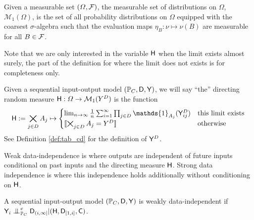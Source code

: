 \begin{definition}
Given a measurable set $(\Omega,\mathcal{F})$, the measurable set of distributions on $\Omega$, $\mathcal{M}_1(\Omega)$, is the set of all probability distributions on $\Omega$ equipped with the coarsest $\sigma$-algebra such that the evaluation maps $\eta_B:\nu\mapsto \nu(B)$ are measurable for all $B\in \mathcal{F}$.
\end{definition}

Note that we are only interested in the variable $\mathsf{H}$ when the limit exists almost surely, the part of the definition for where the limit does not exists is for completeness only.

\begin{definition}\label{def:dir_rand_meas}
Given a sequential input-output model $(\mathbb{P}_C,\mathsf{D},\mathsf{Y})$, we will say ``the'' directing random measure $\mathsf{H}:\Omega\to \mathcal{M}_1(Y^D)$ is the function
\begin{align}
    \RV{H} := \bigtimes_{j\in D} A_j \mapsto \begin{cases}
    \lim_{n\to \infty}\frac{1}{n} \sum_{i=1}^{\infty} \prod_{j\in D} \mathds{1}_{A_j}(\RV{Y}^D_{ij}) & \text{this limit exists}\\
    \llbracket \bigtimes_{j\in D} A_j = Y^D \rrbracket &\text{otherwise}
    \end{cases} 
\end{align}
See Definition \ref{def:tab_cd} for the definition of $\mathsf{Y}^D$.
\end{definition}

Weak data-independence is where outputs are independent of future inputs conditional on past inputs and the directing measure $\mathsf{H}$. Strong data independence is where this independence holds additionally without conditioning on $\mathsf{H}$.

\begin{definition}\label{def:weak_di}
A sequential input-output model $(\mathbb{P}_C,\mathsf{D},\mathsf{Y})$ is weakly data-independent if $\RV{Y}_i\CI^e_{\prob{P}_C} \RV{D}_{(i,\infty]}|(\RV{H},\RV{D}_{[1,i]},\RV{C})$.
\end{definition}



